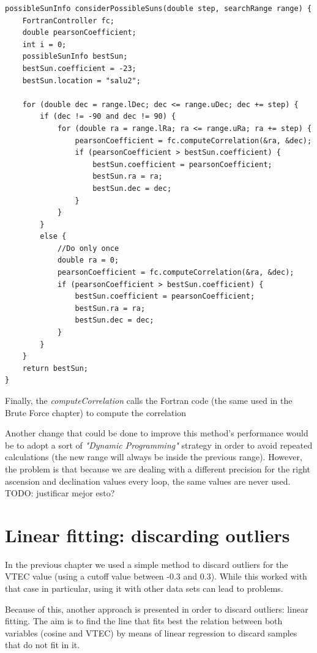 \begin{minipage}{\linewidth}
	\begin{lstlisting}[style=myCStyle, caption=Iterating over possible locations within the given range]
possibleSunInfo considerPossibleSuns(double step, searchRange range) {
	FortranController fc;
	double pearsonCoefficient;
	int i = 0;
	possibleSunInfo bestSun;
	bestSun.coefficient = -23;
	bestSun.location = "salu2";
	
	for (double dec = range.lDec; dec <= range.uDec; dec += step) {
		if (dec != -90 and dec != 90) {
			for (double ra = range.lRa; ra <= range.uRa; ra += step) {
				pearsonCoefficient = fc.computeCorrelation(&ra, &dec);
				if (pearsonCoefficient > bestSun.coefficient) {
					bestSun.coefficient = pearsonCoefficient;
					bestSun.ra = ra;
					bestSun.dec = dec;
				}
			}
		}
		else {
			//Do only once
			double ra = 0;
			pearsonCoefficient = fc.computeCorrelation(&ra, &dec);
			if (pearsonCoefficient > bestSun.coefficient) {
				bestSun.coefficient = pearsonCoefficient;
				bestSun.ra = ra;
				bestSun.dec = dec;
			}
		}
	}
	return bestSun;
}\end{lstlisting}
\end{minipage}

Finally, the \textit{computeCorrelation} calls the Fortran code (the same used in the Brute Force chapter) to compute the correlation

Another change that could be done to improve this method's performance would be to adopt a sort of \textit{"Dynamic Programming"} strategy in order to avoid repeated calculations (the new range will always be inside the previous range). However, the problem is that because we are dealing with a different precision for the right ascension and declination values every loop, the same values are never used. TODO: justificar mejor esto? \\

\section{Linear fitting: discarding outliers}

In the previous chapter we used a simple method to discard outliers for the VTEC value (using a cutoff value between -0.3 and 0.3). While this worked with that case in particular, using it with other data sets can lead to problems.

Because of this, another approach is presented in order to discard outliers: linear fitting. The aim is to find the line that fits best the relation between both variables (cosine and VTEC) by means of linear regression to discard samples that do not fit in it.

